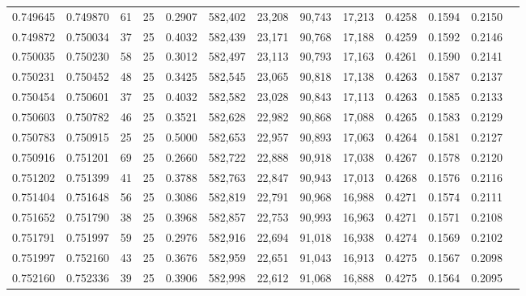 \begin{tabular}{rrrrrrrrrrrrr}
0.749645 & 0.749870 &    61 &  25 &                                     0.2907 & 582,402 &  23,208 &  90,743 &  17,213 & 0.4258 & 0.1594 & 0.2150 \\
0.749872 & 0.750034 &    37 &  25 &                                     0.4032 & 582,439 &  23,171 &  90,768 &  17,188 & 0.4259 & 0.1592 & 0.2146 \\
0.750035 & 0.750230 &    58 &  25 &                                     0.3012 & 582,497 &  23,113 &  90,793 &  17,163 & 0.4261 & 0.1590 & 0.2141 \\
0.750231 & 0.750452 &    48 &  25 &                                     0.3425 & 582,545 &  23,065 &  90,818 &  17,138 & 0.4263 & 0.1587 & 0.2137 \\
0.750454 & 0.750601 &    37 &  25 &                                     0.4032 & 582,582 &  23,028 &  90,843 &  17,113 & 0.4263 & 0.1585 & 0.2133 \\
0.750603 & 0.750782 &    46 &  25 &                                     0.3521 & 582,628 &  22,982 &  90,868 &  17,088 & 0.4265 & 0.1583 & 0.2129 \\
0.750783 & 0.750915 &    25 &  25 &                                     0.5000 & 582,653 &  22,957 &  90,893 &  17,063 & 0.4264 & 0.1581 & 0.2127 \\
0.750916 & 0.751201 &    69 &  25 &                                     0.2660 & 582,722 &  22,888 &  90,918 &  17,038 & 0.4267 & 0.1578 & 0.2120 \\
0.751202 & 0.751399 &    41 &  25 &                                     0.3788 & 582,763 &  22,847 &  90,943 &  17,013 & 0.4268 & 0.1576 & 0.2116 \\
0.751404 & 0.751648 &    56 &  25 &                                     0.3086 & 582,819 &  22,791 &  90,968 &  16,988 & 0.4271 & 0.1574 & 0.2111 \\
0.751652 & 0.751790 &    38 &  25 &                                     0.3968 & 582,857 &  22,753 &  90,993 &  16,963 & 0.4271 & 0.1571 & 0.2108 \\
0.751791 & 0.751997 &    59 &  25 &                                     0.2976 & 582,916 &  22,694 &  91,018 &  16,938 & 0.4274 & 0.1569 & 0.2102 \\
0.751997 & 0.752160 &    43 &  25 &                                     0.3676 & 582,959 &  22,651 &  91,043 &  16,913 & 0.4275 & 0.1567 & 0.2098 \\
0.752160 & 0.752336 &    39 &  25 &                                     0.3906 & 582,998 &  22,612 &  91,068 &  16,888 & 0.4275 & 0.1564 & 0.2095 \\

\end{tabular}
